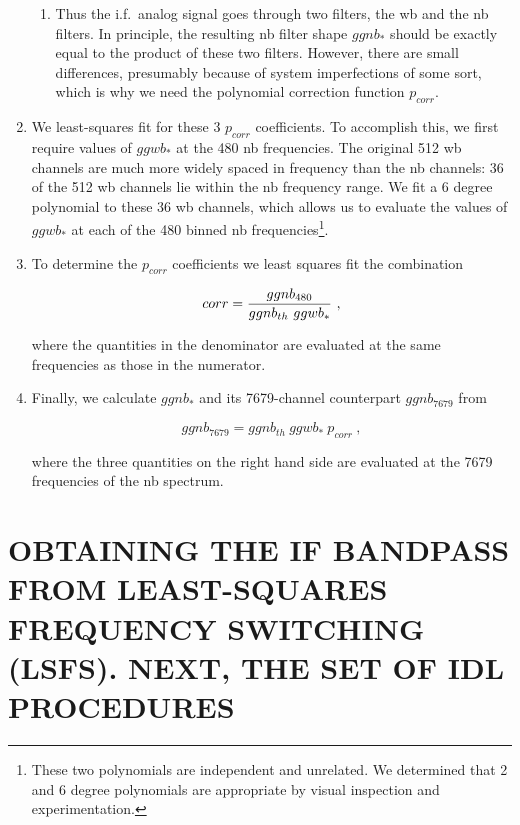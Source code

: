 \documentclass[psfig,preprint]{aastex}
\begin{document}
\begin{enumerate}
\begin{enumerate}
	\item Thus the i.f.\ analog signal goes through two filters, the
wb and the nb filters. In principle, the resulting nb filter shape
$ggnb_*$ should be exactly equal to the product of these two filters.
However, there are small differences, presumably because of system
imperfections of some sort, which is why we need the polynomial
correction function $p_{corr}$. 

\end{enumerate}

	\item We least-squares fit for these 3 $p_{corr}$ coefficients.
To accomplish this, we first require values of $ggwb_*$ at the 480 nb
frequencies. The original 512 wb channels are much more widely spaced in
frequency than the nb channels: 36 of the 512 wb channels lie within
the nb frequency range. We fit a 6 degree polynomial to these 36 wb
channels, which allows us to evaluate the values of $ggwb_*$ at each of
the 480 binned nb frequencies\footnote{These two polynomials are
independent and unrelated. We determined that 2 and 6 degree polynomials
are appropriate by visual inspection and experimentation.}. 

	\item To determine the $p_{corr}$ coefficients we least squares
fit the combination 

\begin{equation} 
corr = { ggnb_{480} \over ggnb_{th} \ ggwb_*} \ ,
\end{equation}

\noindent where the quantities in the denominator are evaluated at the
same frequencies as those in the numerator.

	\item Finally, we calculate $ggnb_*$ and its 7679-channel
counterpart $ggnb_{7679}$ from

\begin{equation}
ggnb_{7679}= ggnb_{th} \ ggwb_* \ p_{corr} \ ,
\end{equation}

\noindent where the three quantities on the right hand side are
evaluated at the 7679 frequencies of the nb spectrum.
\end{enumerate}

\section{ OBTAINING THE IF BANDPASS FROM LEAST-SQUARES FREQUENCY
SWITCHING (LSFS). NEXT, THE SET OF IDL PROCEDURES}
\end{document}
